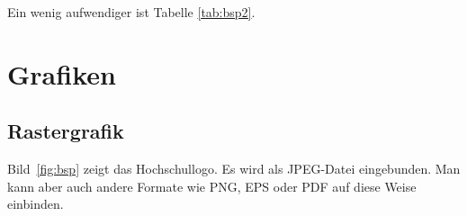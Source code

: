 Ein wenig aufwendiger ist Tabelle \ref{tab:bsp2}.
\lipsum[3]

\begin{table}[!htbp]
  \caption{Tabelle mit , farbigen Zellen und Multicolumn.}
  \label{tab:bsp2}
\end{table}

\section{Grafiken}

\lipsum[1]

\subsection{Rastergrafik}

Bild~\ref{fig:bsp} zeigt das Hochschullogo.
Es wird als JPEG-Datei eingebunden.
Man kann aber auch andere Formate wie PNG, EPS oder PDF auf diese Weise einbinden.

\begin{figure}[!htbp]
\end{figure}

